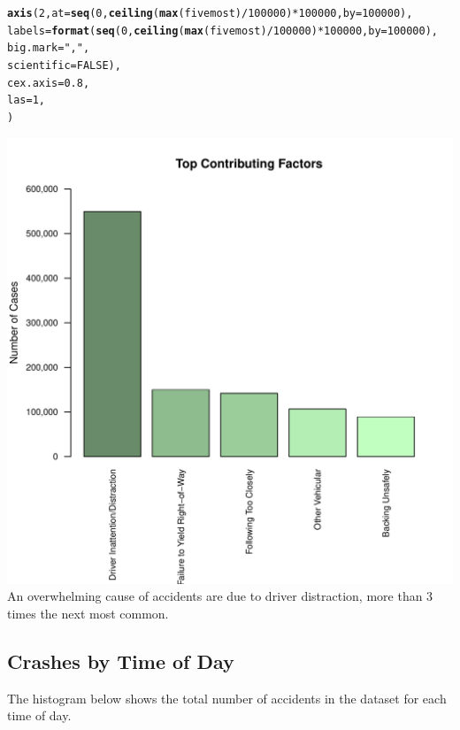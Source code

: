 \documentclass[10pt]{article}\usepackage[]{graphicx}\usepackage[]{xcolor}
\makeatletter
\def\maxwidth{ %
  \ifdim\Gin@nat@width>\linewidth
    \linewidth
  \else
    \Gin@nat@width
  \fi
}
\newcommand{\hlnum}[1]{\textcolor[rgb]{0.686,0.059,0.569}{#1}}%
\newcommand{\hlsng}[1]{\textcolor[rgb]{0.192,0.494,0.8}{#1}}%
\newcommand{\hlopt}[1]{\textcolor[rgb]{0,0,0}{#1}}%
\newcommand{\hldef}[1]{\textcolor[rgb]{0.345,0.345,0.345}{#1}}%
\newcommand{\hlkwc}[1]{\textcolor[rgb]{0.333,0.667,0.333}{#1}}%
\newcommand{\hlkwd}[1]{\textcolor[rgb]{0.737,0.353,0.396}{\textbf{#1}}}%
\newenvironment{kframe}{%
 \def\at@end@of@kframe{}%
 \ifinner\ifhmode%
  \def\at@end@of@kframe{\end{minipage}}%
  \begin{minipage}{\columnwidth}%
 \fi\fi%
 \def\FrameCommand##1{\hskip\@totalleftmargin \hskip-\fboxsep
 \colorbox{shadecolor}{##1}\hskip-\fboxsep
     \hskip-\linewidth \hskip-\@totalleftmargin \hskip\columnwidth}%
 \MakeFramed {\advance\hsize-\width
   \@totalleftmargin\z@ \linewidth\hsize
   \@setminipage}}%
 {\par\unskip\endMakeFramed%
 \at@end@of@kframe}
\newenvironment{knitrout}{}{} %
\makeatother
\begin{document}
\begin{knitrout}
\begin{kframe}
\begin{alltt}
\hlkwd{axis}\hldef{(}\hlnum{2}\hldef{,} \hlkwc{at} \hldef{=} \hlkwd{seq}\hldef{(}\hlnum{0}\hldef{,} \hlkwd{ceiling}\hldef{(}\hlkwd{max}\hldef{(fivemost)}\hlopt{/}\hlnum{100000}\hldef{)}\hlopt{*}\hlnum{100000}\hldef{,} \hlkwc{by} \hldef{=} \hlnum{100000}\hldef{),}
     \hlkwc{labels} \hldef{=} \hlkwd{format}\hldef{(}\hlkwd{seq}\hldef{(}\hlnum{0}\hldef{,} \hlkwd{ceiling}\hldef{(}\hlkwd{max}\hldef{(fivemost)}\hlopt{/}\hlnum{100000}\hldef{)}\hlopt{*}\hlnum{100000}\hldef{,} \hlkwc{by} \hldef{=} \hlnum{100000}\hldef{),}
                     \hlkwc{big.mark} \hldef{=} \hlsng{","}\hldef{,}
                     \hlkwc{scientific} \hldef{=} \hlnum{FALSE}\hldef{),}
     \hlkwc{cex.axis} \hldef{=} \hlnum{0.8}\hldef{,}
     \hlkwc{las} \hldef{=} \hlnum{1}\hldef{,}
     \hldef{)}
\end{alltt}
\end{kframe}
\includegraphics[width=\maxwidth]{figure/unnamed-chunk-4-1} 
\end{knitrout}
An overwhelming cause of accidents are due to driver distraction, more than 3 times the next most common.


\subsection{Crashes by Time of Day}

The histogram below shows the total number of accidents in the dataset for each time of day. 
\end{document}
